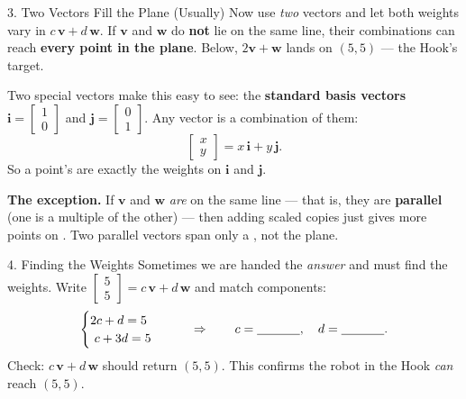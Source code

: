 \documentclass[10pt]{article}
\newcommand{\vv}{\mathbf{v}}
\newcommand{\ww}{\mathbf{w}}
\begin{document}
\begin{notesbox}{3. Two Vectors Fill the Plane (Usually)}
Now use \emph{two} vectors and let both weights vary in $c\,\vv+d\,\ww$. If $\vv$ and $\ww$ do
\textbf{not} lie on the same line, their combinations can reach \textbf{every point in the
plane}. Below, $2\vv+\ww$ lands on $(5,5)$ --- the Hook's target.

\vspace{2pt}
\begin{center}
\end{center}
Two special vectors make this easy to see: the \textbf{standard basis vectors}
$\mathbf{i}=\begin{bmatrix} 1 \\ 0 \end{bmatrix}$ and
$\mathbf{j}=\begin{bmatrix} 0 \\ 1 \end{bmatrix}$. Any vector is a combination of them:
\[
  \begin{bmatrix} x \\ y \end{bmatrix} = x\,\mathbf{i} + y\,\mathbf{j}.
\]
So a point's \blank{2.8cm} are exactly the weights on $\mathbf{i}$ and $\mathbf{j}$.

\vspace{4pt}
\textbf{The exception.} If $\vv$ and $\ww$ \emph{are} on the same line --- that is, they are
\textbf{parallel} (one is a multiple of the other) --- then adding scaled copies just gives
more points on \blank{4.0cm}. Two parallel vectors span only a \blank{1.8cm}, not the plane.
\end{notesbox}

\begin{notesbox}{4. Finding the Weights}
Sometimes we are handed the \emph{answer} and must find the weights. Write
$\begin{bmatrix} 5 \\ 5 \end{bmatrix} = c\,\vv + d\,\ww$ and match components:
\[
  \begin{cases} 2c + d = 5 \\ \ c + 3d = 5 \end{cases}
  \qquad\Rightarrow\qquad c = \blank{1.2cm}, \quad d = \blank{1.2cm}.
\]
Check: $c\,\vv+d\,\ww$ should return $(5,5)$. This confirms the robot in the Hook \emph{can}
reach $(5,5)$.
\end{notesbox}
\end{document}
